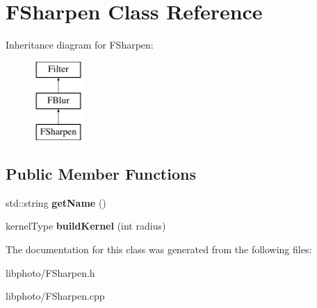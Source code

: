 \hypertarget{classFSharpen}{\section{F\-Sharpen Class Reference}
\label{classFSharpen}
}
Inheritance diagram for F\-Sharpen\-:\begin{figure}[H]
\begin{center}
\leavevmode
\includegraphics[height=3.000000cm]{classFSharpen}
\end{center}
\end{figure}
\subsection*{Public Member Functions}
\begin{DoxyCompactItemize}
\item 
\hypertarget{classFSharpen_ae322ad5626a003ae1e1c6e385dd43ca8}{std\-::string {\bfseries get\-Name} ()}\label{classFSharpen_ae322ad5626a003ae1e1c6e385dd43ca8}

\item 
\hypertarget{classFSharpen_afafd2b34e58d2fb682150be2159d7986}{kernel\-Type {\bfseries build\-Kernel} (int radius)}\label{classFSharpen_afafd2b34e58d2fb682150be2159d7986}

\end{DoxyCompactItemize}


The documentation for this class was generated from the following files\-:\begin{DoxyCompactItemize}
\item 
libphoto/F\-Sharpen.\-h\item 
libphoto/F\-Sharpen.\-cpp\end{DoxyCompactItemize}
